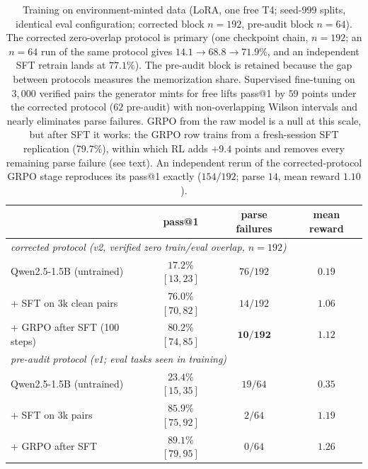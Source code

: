 \documentclass{article}
\begin{document}
\begin{table}[t]
\centering\small
\begin{tabular}{lccc}
\toprule
 & pass@1 & parse failures & mean reward \\
\midrule
\multicolumn{4}{l}{\emph{corrected protocol (v2, verified zero train/eval overlap, $n{=}192$)}} \\
Qwen2.5-1.5B (untrained) & $17.2\%$ $[13,23]$ & $76/192$ & $0.19$ \\
+ SFT on 3k clean pairs & $76.0\%$ $[70,82]$ & $14/192$ & $1.06$ \\
+ GRPO after SFT (100 steps) & $\mathbf{80.2\%}$ $[74,85]$ & $\mathbf{10/192}$ & $\mathbf{1.12}$ \\
\midrule
\multicolumn{4}{l}{\emph{pre-audit protocol (v1; eval tasks seen in training)}} \\
Qwen2.5-1.5B (untrained) & $23.4\%$ $[15,35]$ & $19/64$ & $0.35$ \\
+ SFT on 3k pairs & $85.9\%$ $[75,92]$ & $2/64$ & $1.19$ \\
+ GRPO after SFT & $89.1\%$ $[79,95]$ & $0/64$ & $1.26$ \\
\bottomrule
\end{tabular}
\caption{Training on environment-minted data (LoRA, one free T4; seed-999 splits, identical eval configuration; corrected block $n{=}192$, pre-audit block $n{=}64$). The corrected zero-overlap protocol is primary (one checkpoint chain, $n{=}192$; an $n{=}64$ run of the same protocol gives $14.1\to68.8\to71.9\%$, and an independent SFT retrain lands at $77.1\%$). The pre-audit block is retained because the gap between protocols measures the memorization share. Supervised fine-tuning on $3{,}000$ verified pairs the generator mints for free lifts pass@1 by $59$ points under the corrected protocol ($62$ pre-audit) with non-overlapping Wilson intervals and nearly eliminates parse failures. GRPO from the raw model is a null at this scale, but after SFT it works: the GRPO row trains from a fresh-session SFT replication ($79.7\%$), within which RL adds $+9.4$ points and removes every remaining parse failure (see text). An independent rerun of the corrected-protocol GRPO stage reproduces its pass@1 exactly ($154/192$; parse $14$, mean reward $1.10$).}
\label{tab:rl}
\end{table}
\end{document}
